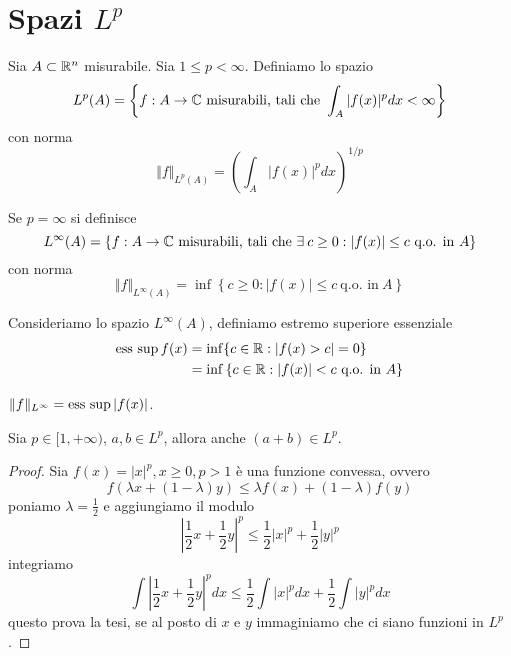 \section{Spazi $L^{p}$}

\begin{defn}
[Spazio $L^{p}$] Sia $A\subset \mathbb{R}^{n}$ misurabile. Sia $1\leq p < \infty $. Definiamo lo spazio
\begin{equation*}
L^{p}(A) = \left\{f: A\rightarrow \mathbb{C} \ \text{misurabili, tali che} \ \int_{A}| f(x)|^{p} dx < \infty \right\}
\end{equation*}
con norma
\begin{equation*}
\Vert f \Vert_{L^{p}(A)} = \left(\int_{A}| f(x)|^{p} dx\right)^{1/p}
\end{equation*}
\end{defn}
\begin{defn}
Se $p = \infty $ si definisce
\begin{equation*}
L^{\infty}(A) = \left\{f: A\rightarrow \CC \ \text{misurabili, tali che} \ \exists c\geq 0: | f(x)| \leq c\ \text{q.o. in} \ A\right\}
\end{equation*}
con norma
\begin{equation*}
\Vert f \Vert_{L^{\infty}(A)} = \inf\left\{c\geq 0: | f(x)| \leq c\ \text{q.o. in} \ A\right\}
\end{equation*}
\end{defn}
\begin{defn}
Consideriamo lo spazio $L^{\infty}(A)$, definiamo estremo superiore essenziale
\begin{equation*}
\begin{aligned}
\operatorname*{ess\ sup} f(x) & = \inf\{c\in \mathbb{R} : | f(x) > c| = 0\}\\
 & = \inf\left\{c\in \mathbb{R} : | f(x)| < c\ \text{q.o. in} \ A\right\}
\end{aligned}
\end{equation*}
\end{defn}
\begin{rem}
$ \Vert f \Vert_{L^{\infty}} = \operatorname*{ess\ sup}| f(x)| $.
\end{rem}
\begin{thm}
Sia $p\in [1, + \infty)$, $a, b\in L^{p}$, allora anche $(a + b) \in L^{p}$.
\end{thm}
\begin{proof}

Sia $f(x) = | x|^{p}, x\geq 0, p > 1$ è una funzione convessa, ovvero
\begin{equation*}
f(\lambda x + (1 - \lambda) y) \leq \lambda f(x) + (1 - \lambda) f(y)
\end{equation*}
poniamo $\lambda = \frac{1}{2}$ e aggiungiamo il modulo
\begin{equation*}
\left| \frac{1}{2} x + \frac{1}{2} y\right|^{p} \leq \frac{1}{2}| x|^{p} + \frac{1}{2}| y|^{p}
\end{equation*}
integriamo
\begin{equation*}
\int \left| \frac{1}{2} x + \frac{1}{2} y\right|^{p} dx\leq \frac{1}{2}\int | x|^{p} dx + \frac{1}{2}\int | y|^{p} dx
\end{equation*}
questo prova la tesi, se al posto di $x$ e $y$ immaginiamo che ci siano funzioni in $L^{p}$.
\end{proof}
